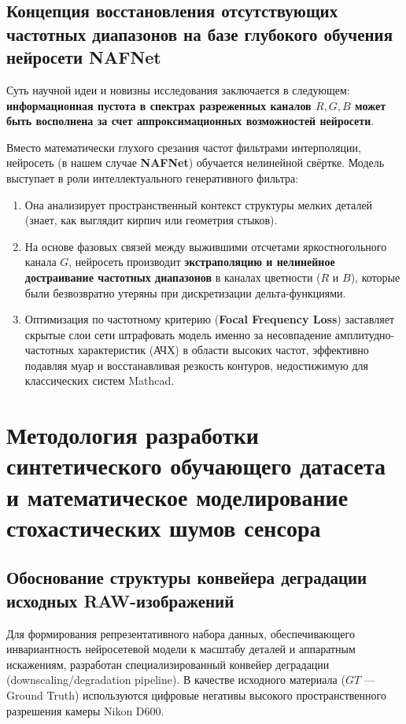 \documentclass[12pt,a4paper]{article}
\begin{document}
\subsection{Концепция восстановления отсутствующих частотных диапазонов на базе глубокого обучения нейросети NAFNet}
Суть научной идеи и новизны исследования заключается в следующем: \textbf{информационная пустота в спектрах разреженных каналов $R, G, B$ может быть восполнена за счет аппроксимационных возможностей нейросети}.

Вместо математически глухого срезания частот фильтрами интерполяции, нейросеть (в нашем случае \textbf{NAFNet}) обучается нелинейной свёртке. Модель выступает в роли интеллектуального генеративного фильтра:
\begin{enumerate}
    \item Она анализирует пространственный контекст структуры мелких деталей (знает, как выглядит кирпич или геометрия стыков).
    \item На основе фазовых связей между выжившими отсчетами яркостногольного канала $G$, нейросеть производит \textbf{экстраполяцию и нелинейное достраивание частотных диапазонов} в каналах цветности ($R$ и $B$), которые были безвозвратно утеряны при дискретизации дельта-функциями.
    \item Оптимизация по частотному критерию (\textbf{Focal Frequency Loss}) заставляет скрытые слои сети штрафовать модель именно за несовпадение амплитудно-частотных характеристик (АЧХ) в области высоких частот, эффективно подавляя муар и восстанавливая резкость контуров, недостижимую для классических систем Mathcad.
\end{enumerate}

\section{Методология разработки синтетического обучающего датасета и математическое моделирование стохастических шумов сенсора}

\subsection{Обоснование структуры конвейера деградации исходных RAW-изображений}
Для формирования репрезентативного набора данных, обеспечивающего инвариантность нейросетевой модели к масштабу деталей и аппаратным искажениям, разработан специализированный конвейер деградации (downscaling/degradation pipeline). В качестве исходного материала ($GT$ --- Ground Truth) используются цифровые негативы высокого пространственного разрешения камеры Nikon D600.
\end{document}
